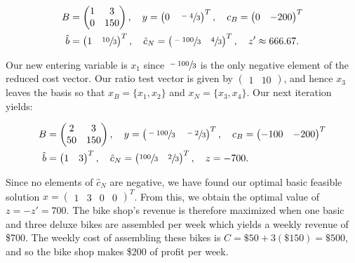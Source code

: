 \begin{solution}
  \begin{align*}
    B &= \begin{pmatrix}
      1 & 3 \\
      0 & 150
    \end{pmatrix}, \quad y = \begin{pmatrix}
      0 & \sfrac{-4}{3}
    \end{pmatrix}^T, \quad c_B = \begin{pmatrix}
      0 & -200
    \end{pmatrix}^T \\
    \hat{b} &= \begin{pmatrix}
      1 & \sfrac{10}{3}
    \end{pmatrix}^T, \quad \hat{c}_N = \begin{pmatrix}
      \sfrac{-100}{3} & \sfrac{4}{3}
    \end{pmatrix}^T, \quad z' \approx 666.67.
  \end{align*}

  Our new entering variable is $x_1$ since $\sfrac{-100}{3}$ is the only negative element of the reduced cost vector. 
  Our ratio test vector is given by $\begin{pmatrix} 1 & 10 \end{pmatrix}$, and hence $x_3$ leaves the basis so that 
  $x_B = \{ x_1, x_2 \}$ and $x_N = \{ x_3, x_4 \}$. Our next iteration yields:

  \begin{align*}
    B &= \begin{pmatrix}
      2  & 3 \\
      50 & 150
    \end{pmatrix}, \quad y = \begin{pmatrix}
      \sfrac{-100}{3} & \sfrac{-2}{3}
    \end{pmatrix}^T, \quad c_B = \begin{pmatrix}
      -100 & -200
    \end{pmatrix}^T \\
    \hat{b} &= \begin{pmatrix}
      1 & 3
    \end{pmatrix}^T, \quad \hat{c}_N = \begin{pmatrix}
      \sfrac{100}{3} & \sfrac{2}{3}
    \end{pmatrix}^T, \quad z = -700.
  \end{align*}

  Since no elements of $\hat{c}_N$ are negative, we have found our optimal basic feasible solution
  $x = \begin{pmatrix} 1 & 3 & 0 & 0 \end{pmatrix}^T$. From this, we obtain the optimal value of $z = -z' = 700$.
  The bike shop's revenue is therefore maximized when one basic and three deluxe bikes are assembled per week which
  yields a weekly revenue of \$700. The weekly cost of assembling these bikes is $C = \$50 + 3(\$150) = \$500$, and so
  the bike shop makes \$200 of profit per week.
\end{solution}